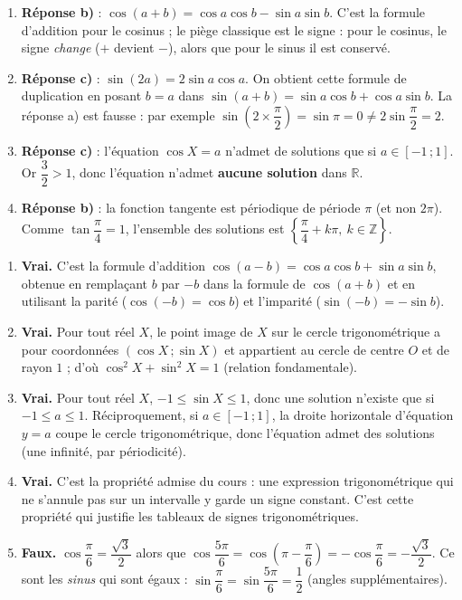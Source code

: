 \documentclass[11pt]{article}
\begin{document}
\begin{corrige}
\begin{enumerate}
\item \textbf{Réponse b)} : $\cos(a+b)=\cos a\cos b-\sin a\sin b$. C'est la formule d'addition pour le cosinus ; le piège classique est le signe : pour le cosinus, le signe \emph{change} ($+$ devient $-$), alors que pour le sinus il est conservé.
\item \textbf{Réponse c)} : $\sin(2a)=2\sin a\cos a$. On obtient cette formule de duplication en posant $b=a$ dans $\sin(a+b)=\sin a\cos b+\cos a\sin b$. La réponse a) est fausse : par exemple $\sin\left(2\times\dfrac{\pi}{2}\right)=\sin\pi=0\neq 2\sin\dfrac{\pi}{2}=2$.
\item \textbf{Réponse c)} : l'équation $\cos X=a$ n'admet de solutions que si $a\in[-1\,;1]$. Or $\dfrac{3}{2}>1$, donc l'équation n'admet \textbf{aucune solution} dans $\mathbb{R}$.
\item \textbf{Réponse b)} : la fonction tangente est périodique de période $\pi$ (et non $2\pi$). Comme $\tan\dfrac{\pi}{4}=1$, l'ensemble des solutions est $\left\{\dfrac{\pi}{4}+k\pi,\ k\in\mathbb{Z}\right\}$.
\end{enumerate}
\end{corrige}

\begin{corrige}
\begin{enumerate}
\item \textbf{Vrai.} C'est la formule d'addition $\cos(a-b)=\cos a\cos b+\sin a\sin b$, obtenue en remplaçant $b$ par $-b$ dans la formule de $\cos(a+b)$ et en utilisant la parité ($\cos(-b)=\cos b$) et l'imparité ($\sin(-b)=-\sin b$).
\item \textbf{Vrai.} Pour tout réel $X$, le point image de $X$ sur le cercle trigonométrique a pour coordonnées $(\cos X\,;\sin X)$ et appartient au cercle de centre $O$ et de rayon $1$ ; d'où $\cos^2 X+\sin^2 X=1$ (relation fondamentale).
\item \textbf{Vrai.} Pour tout réel $X$, $-1\leq\sin X\leq 1$, donc une solution n'existe que si $-1\leq a\leq 1$. Réciproquement, si $a\in[-1\,;1]$, la droite horizontale d'équation $y=a$ coupe le cercle trigonométrique, donc l'équation admet des solutions (une infinité, par périodicité).
\item \textbf{Vrai.} C'est la propriété admise du cours : une expression trigonométrique qui ne s'annule pas sur un intervalle y garde un signe constant. C'est cette propriété qui justifie les tableaux de signes trigonométriques.
\item \textbf{Faux.} $\cos\dfrac{\pi}{6}=\dfrac{\sqrt{3}}{2}$ alors que $\cos\dfrac{5\pi}{6}=\cos\left(\pi-\dfrac{\pi}{6}\right)=-\cos\dfrac{\pi}{6}=-\dfrac{\sqrt{3}}{2}$. Ce sont les \emph{sinus} qui sont égaux : $\sin\dfrac{\pi}{6}=\sin\dfrac{5\pi}{6}=\dfrac{1}{2}$ (angles supplémentaires).
\end{enumerate}
\end{corrige}
\end{document}
